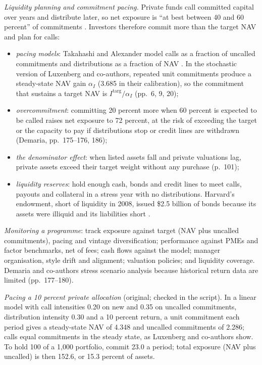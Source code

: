 \begin{qfmethod}
\emph{Liquidity planning and commitment pacing.} Private funds call committed capital over years and distribute later, so net exposure is ``at best between 40 and 60 percent'' of commitments \citep[p.~186]{demaria-private-markets-2021}. Investors therefore commit more than the target NAV and plan for calls:
\begin{itemize}
\item \emph{pacing models}: Takahashi and Alexander model calls as a fraction of uncalled commitments and distributions as a fraction of NAV \citep[p.~3]{depth-pe-luxenberg-2022}. In the stochastic version of Luxenberg and co-authors, repeated unit commitments produce a steady-state NAV gain $\alpha_I$ (3.685 in their calibration), so the commitment that sustains a target NAV is $I^{\text{targ}}/\alpha_I$ (pp.~6, 9, 20);
\item \emph{overcommitment}: committing 20 percent more when 60 percent is expected to be called raises net exposure to 72 percent, at the risk of exceeding the target or the capacity to pay if distributions stop or credit lines are withdrawn (Demaria, pp.~175--176, 186);
\item \emph{the denominator effect}: when listed assets fall and private valuations lag, private assets exceed their target weight without any purchase (p.~101);
\item \emph{liquidity reserves}: hold enough cash, bonds and credit lines to meet calls, payouts and collateral in a stress year with no distributions. Harvard's endowment, short of liquidity in 2008, issued \$2.5 billion of bonds because its assets were illiquid and its liabilities short \citep[pp.~441--442]{s7-ang}.
\end{itemize}

\emph{Monitoring a programme}: track exposure against target (NAV plus uncalled commitments), pacing and vintage diversification; performance against PMEs and factor benchmarks, net of fees; cash flows against the model; manager organisation, style drift and alignment; valuation policies; and liquidity coverage. Demaria and co-authors stress scenario analysis because historical return data are limited (pp.~177--180).

 \emph{Pacing a 10 percent private allocation} (original; checked in the script). In a linear model with call intensities 0.20 on new and 0.35 on uncalled commitments, distribution intensity 0.30 and a 10 percent return, a unit commitment each period gives a steady-state NAV of 4.348 and uncalled commitments of 2.286; calls equal commitments in the steady state, as Luxenberg and co-authors show. To hold 100 of a 1,000 portfolio, commit 23.0 a period; total exposure (NAV plus uncalled) is then 152.6, or 15.3 percent of assets.


\end{qfmethod}
